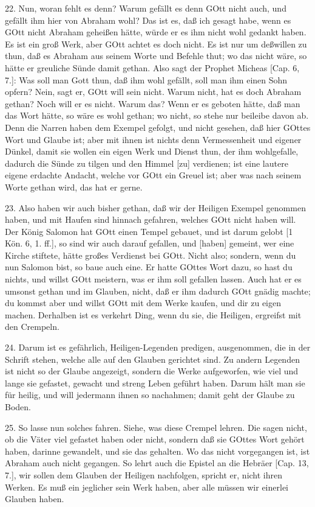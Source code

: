 22. Nun, woran fehlt es denn? Warum gefällt es denn GOtt nicht auch, und gefällt ihm hier von Abraham wohl? Das ist es, daß ich gesagt habe, wenn es GOtt nicht Abraham geheißen hätte, würde er es ihm nicht wohl gedankt haben. Es ist ein groß Werk, aber GOtt achtet es doch nicht. Es ist nur um deßwillen zu thun, daß es Abraham aus seinem Worte und Befehle thut; wo das nicht wäre, so hätte er greuliche Sünde damit gethan. Also sagt der Prophet Micheas [Cap. 6, 7.]: Was soll man Gott thun, daß ihm wohl gefällt, soll man ihm einen Sohn opfern? Nein, sagt er, GOtt will sein nicht. Warum nicht, hat es doch Abraham gethan? Noch will er es nicht. Warum das? Wenn er es geboten hätte, daß man das Wort hätte, so wäre es wohl gethan; wo nicht, so stehe nur beileibe davon ab. Denn die Narren haben dem Exempel gefolgt, und nicht gesehen, daß hier GOttes Wort und Glaube ist; aber mit ihnen ist nichts denn Vermessenheit und eigener Dünkel, damit sie wollen ein eigen Werk und Dienst thun, der ihm wohlgefalle, dadurch die Sünde zu tilgen und den Himmel [zu] verdienen; ist eine lautere eigene erdachte Andacht, welche vor GOtt ein Greuel ist; aber was nach seinem Worte gethan wird, das hat er gerne.

23. Also haben wir auch bisher gethan, daß wir der Heiligen Exempel genommen haben, und mit Haufen sind hinnach gefahren, welches GOtt nicht haben will. Der König Salomon hat GOtt einen Tempel gebauet, und ist darum gelobt [1 Kön. 6, 1. ff.], so sind wir auch darauf gefallen, und [haben] gemeint, wer eine Kirche stiftete, hätte großes Verdienst bei GOtt. Nicht also; sondern, wenn du nun Salomon bist, so
baue auch eine. Er hatte GOttes Wort dazu, so hast du nichts, und willst GOtt meistern, was er ihm soll gefallen lassen. Auch hat er es umsonst gethan und im Glauben, nicht, daß er ihm dadurch GOtt gnädig machte; du kommst aber und willst GOtt mit dem Werke kaufen, und dir zu eigen machen. Derhalben ist es verkehrt Ding, wenn du sie, die Heiligen, ergreifst mit den Crempeln.

24. Darum ist es gefährlich, Heiligen-Legenden predigen, ausgenommen, die in der Schrift stehen, welche alle auf den Glauben gerichtet sind. Zu andern Legenden ist nicht so der Glaube angezeigt, sondern die Werke aufgeworfen, wie viel und lange sie gefastet, gewacht und streng Leben geführt haben. Darum hält man sie für heilig, und will jedermann ihnen so nachahmen; damit geht der Glaube zu Boden.

25. So lasse nun solches fahren. Siehe, was diese Crempel lehren. Die sagen nicht, ob die Väter viel gefastet haben oder nicht, sondern daß sie GOttes Wort gehört haben, darinne gewandelt, und sie das gehalten. Wo das nicht vorgegangen ist, ist Abraham auch nicht gegangen. So lehrt auch die Epistel an die Hebräer [Cap. 13, 7.], wir sollen dem Glauben der Heiligen nachfolgen, spricht er, nicht ihren Werken. Es muß ein jeglicher sein Werk haben, aber alle müssen wir einerlei Glauben haben.

